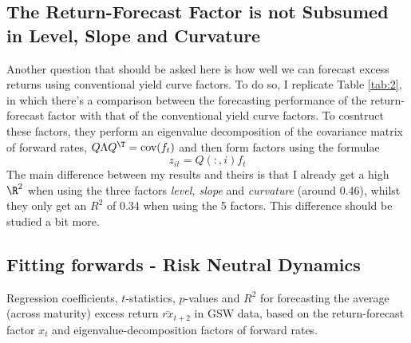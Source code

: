 \subsection{The Return-Forecast Factor is not Subsumed in Level, Slope and Curvature}

Another question that should be asked here is how well we can forecast excess returns using conventional yield curve factors. To do so, I replicate Table \ref{tab:2}, in which there's a comparison between the forecasting performance of the return-forecast factor with that of the conventional yield curve factors. To cosntruct these factors, they perform an eigenvalue decomposition of the covariance matrix of forward rates, $Q\Lambda Q^\T = \text{cov}(f_t)$ and then form factors using the formulae
\begin{equation}
	z_{it} = Q\left(:,i\right) f_t
\end{equation}
The main difference between my results and theirs is that I already get a high $\R^2$ when using the three factors \emph{level, slope} and \emph{curvature} (around 0.46), whilst they only get an $R^2$ of 0.34 when using the 5 factors. This difference should be studied a bit more.

\subsection{Fitting forwards - Risk Neutral Dynamics}
\begin{table}[h!]
	\centering
	\caption{Regression coefficients, $t$-statistics, $p$-values and $R^2$ for forecasting the average (across maturity) excess return $\bar{rx}_{t+2}$ in GSW data, based on the return-forecast factor $x_t$ and eigenvalue-decomposition factors of forward rates.}\label{tab:2}
	
\end{table}

